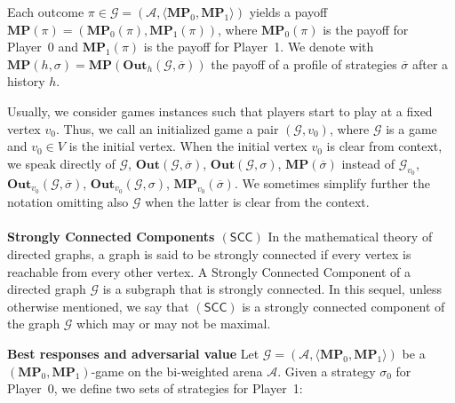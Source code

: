 Each outcome $\pi \in \mathcal{G} = (\mathcal{A},\langle \mathbf{MP}_0, \mathbf{MP}_1\rangle)$ yields a payoff $\mathbf{MP}(\pi)=(\mathbf{MP}_0(\pi),\mathbf{MP}_1(\pi))$, where $\mathbf{MP}_0(\pi)$ is the payoff for Player~0 and $\mathbf{MP}_1(\pi)$ is the payoff for Player~1. We denote with $\mathbf{MP}(h, \sigma) = \mathbf{MP}(\mathbf{Out}_h(\mathcal{G}, \overline{\sigma}))$ the payoff of a profile of strategies $\overline{\sigma}$ after a history $h$.

Usually, we consider games instances such that players start to play at a fixed vertex $v_0$. Thus, we call an initialized game a pair $(\mathcal{G}, v_0)$, where $\mathcal{G}$ is a game and $v_0 \in V$ is the initial vertex. When the initial vertex $v_0$ is clear from context, we speak directly of $\mathcal{G}$, $\mathbf{Out}(\mathcal{G}, \overline{\sigma})$, $\mathbf{Out}(\mathcal{G},\sigma)$, $\mathbf{MP}(\overline{\sigma})$ instead of $\mathcal{G}_{v_0}$, $\mathbf{Out}_{v_0}(\mathcal{G}, \overline{\sigma})$, $\mathbf{Out}_{v_0}(\mathcal{G},\sigma)$, $\mathbf{MP}_{v_0}(\overline{\sigma})$. We sometimes simplify further the notation omitting also $\mathcal{G}$ when the latter is clear from the context.
\\
\\
\noindent\textbf{Strongly Connected Components $\mathsf{(SCC)}$} In the mathematical theory of directed graphs, a graph is said to be strongly connected if every vertex is reachable from every other vertex. A Strongly Connected Component of a directed graph $\mathcal{G}$ is a subgraph that is strongly connected. In this sequel, unless otherwise mentioned, we say that $\mathsf{(SCC)}$ is a strongly connected component of the graph $\mathcal{G}$ which may or may not be maximal.

\noindent\textbf{Best responses and adversarial value} Let $\mathcal{G} = (\mathcal{A},\langle \mathbf{MP}_0, \mathbf{MP}_1\rangle)$ be a $(\mathbf{MP}_0, \mathbf{MP}_1)$-game on the bi-weighted arena $\mathcal{A}$. Given a strategy $\sigma_0$ for Player~0, we define two sets of strategies for Player~1:
\\

